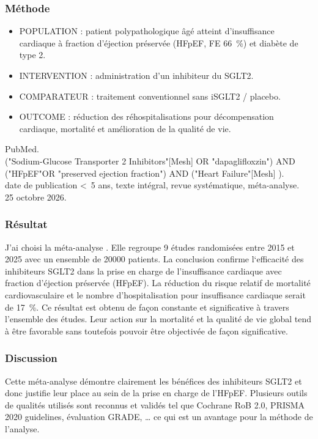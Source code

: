 \subsubsection{Méthode}
\begin{itemize}[compact, label=\textbullet]
    \item POPULATION : patient polypathologique âgé atteint d'insuffisance cardiaque à fraction d'éjection préservée (HFpEF, FE \qty{66}{\percent}) et diabète de type 2.
    \item INTERVENTION : administration d'un inhibiteur du SGLT2.
    \item COMPARATEUR : traitement conventionnel sans iSGLT2 / placebo.
    \item OUTCOME : réduction des réhospitalisations pour décompensation cardiaque, mortalité et amélioration de la qualité de vie.
    \end{itemize}
 PubMed.\\
 ("Sodium-Glucose Transporter 2 Inhibitors"[Mesh] OR "dapaglifloxzin") AND ("HFpEF"OR "preserved ejection fraction") AND ("Heart Failure"[Mesh] ).\\
 date de publication <~5 ans, texte intégral, revue systématique, méta-analyse.\\
 25 octobre 2026.

\subsubsection{Résultat}
J’ai choisi la méta-analyse \textcite{minisy2025role}. Elle regroupe 9 études randomisées entre 2015 et 2025 avec un ensemble de \num{20000} patients. La conclusion confirme l‘efficacité des inhibiteurs SGLT2 dans la prise en charge de l’insuffisance cardiaque avec fraction d’éjection préservée (HFpEF). La réduction du risque relatif de mortalité cardiovasculaire et le nombre d’hospitalisation pour insuffisance cardiaque serait de \qty{17}{\percent}. Ce résultat est obtenu de façon constante et significative à travers l’ensemble des études. Leur action sur la mortalité et la qualité de vie global tend à être favorable sans toutefois pouvoir être objectivée de façon significative. 

\subsubsection{Discussion}
Cette méta-analyse démontre clairement les bénéfices des inhibiteurs SGLT2 et donc justifie leur place au sein de la prise en charge de l’HFpEF. Plusieurs outils de qualités utilisés sont reconnus et validés tel que Cochrane RoB 2.0, PRISMA 2020 guidelines, évaluation GRADE, … ce qui est un avantage pour la méthode de l’analyse.

